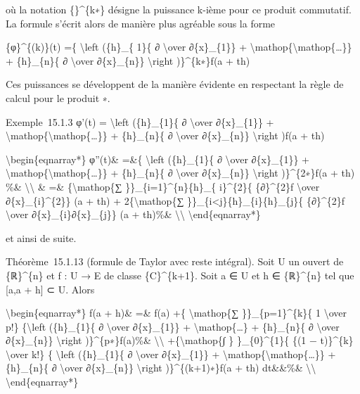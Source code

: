 où la notation \{\}\^{}\{k∗\} désigne la puissance k-ième pour ce
produit commutatif. La formule s'écrit alors de manière plus agréable
sous la forme

\{φ\}\^{}\{(k)\}(t) =\{ \textbackslash{}left (\{h\}\_\{ 1\}\{ ∂
\textbackslash{}over ∂\{x\}\_\{1\}\} +
\textbackslash{}mathop\{\textbackslash{}mathop\{\ldots{}\}\} +
\{h\}\_\{n\}\{ ∂ \textbackslash{}over ∂\{x\}\_\{n\}\}
\textbackslash{}right )\}\^{}\{k∗\}f(a + th)

Ces puissances se développent de la manière évidente en respectant la
règle de calcul pour le produit ∗.

Exemple~15.1.3 φ'(t) = \textbackslash{}left (\{h\}\_\{1\}\{ ∂
\textbackslash{}over ∂\{x\}\_\{1\}\} +
\textbackslash{}mathop\{\textbackslash{}mathop\{\ldots{}\}\} +
\{h\}\_\{n\}\{ ∂ \textbackslash{}over ∂\{x\}\_\{n\}\}
\textbackslash{}right )f(a + th)

\textbackslash{}begin\{eqnarray*\} φ''(t)\& =\&\{ \textbackslash{}left
(\{h\}\_\{1\}\{ ∂ \textbackslash{}over ∂\{x\}\_\{1\}\} +
\textbackslash{}mathop\{\textbackslash{}mathop\{\ldots{}\}\} +
\{h\}\_\{n\}\{ ∂ \textbackslash{}over ∂\{x\}\_\{n\}\}
\textbackslash{}right )\}\^{}\{2∗\}f(a + th) \%\&
\textbackslash{}\textbackslash{} \& =\& \{\textbackslash{}mathop\{∑
\}\}\_\{i=1\}\^{}\{n\}\{h\}\_\{ i\}\^{}\{2\}\{ \{∂\}\^{}\{2\}f
\textbackslash{}over ∂\{x\}\_\{i\}\^{}\{2\}\} (a + th) +
2\{\textbackslash{}mathop\{∑
\}\}\_\{i\textless{}j\}\{h\}\_\{i\}\{h\}\_\{j\}\{ \{∂\}\^{}\{2\}f
\textbackslash{}over ∂\{x\}\_\{i\}∂\{x\}\_\{j\}\} (a + th)\%\&
\textbackslash{}\textbackslash{} \textbackslash{}end\{eqnarray*\}

et ainsi de suite.

Théorème~15.1.13 (formule de Taylor avec reste intégral). Soit U un
ouvert de \{ℝ\}\^{}\{n\} et f : U → E de classe \{C\}\^{}\{k+1\}. Soit a
∈ U et h ∈ \{ℝ\}\^{}\{n\} tel que {[}a,a + h{]} ⊂ U. Alors

\textbackslash{}begin\{eqnarray*\} f(a + h)\& =\& f(a) +\{
\textbackslash{}mathop\{∑ \}\}\_\{p=1\}\^{}\{k\}\{ 1
\textbackslash{}over p!\} \{\textbackslash{}left (\{h\}\_\{1\}\{ ∂
\textbackslash{}over ∂\{x\}\_\{1\}\} +
\textbackslash{}mathop\{\ldots{}\} + \{h\}\_\{n\}\{ ∂
\textbackslash{}over ∂\{x\}\_\{n\}\} \textbackslash{}right
)\}\^{}\{p∗\}f(a)\%\& \textbackslash{}\textbackslash{}
+\{\textbackslash{}mathop\{∫ \} \}\_\{0\}\^{}\{1\}\{ \{(1 −
t)\}\^{}\{k\} \textbackslash{}over k!\} \{ \textbackslash{}left
(\{h\}\_\{1\}\{ ∂ \textbackslash{}over ∂\{x\}\_\{1\}\} +
\textbackslash{}mathop\{\textbackslash{}mathop\{\ldots{}\}\} +
\{h\}\_\{n\}\{ ∂ \textbackslash{}over ∂\{x\}\_\{n\}\}
\textbackslash{}right )\}\^{}\{(k+1)∗\}f(a + th) dt\&\&\%\&
\textbackslash{}\textbackslash{} \textbackslash{}end\{eqnarray*\}

